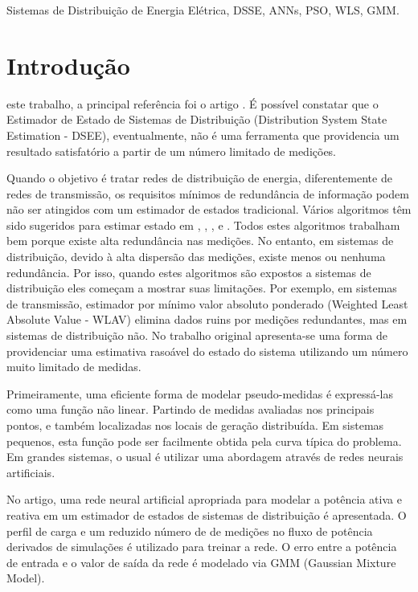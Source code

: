 \documentclass{IEEEtran}
\begin{document}
\begin{IEEEkeywords}
Sistemas de Distribuição de Energia Elétrica, DSSE, ANNs, PSO, WLS, GMM.
\end{IEEEkeywords}

\IEEEpeerreviewmaketitle

\section{Introdução}
 este trabalho, a principal referência foi o artigo \cite{manitsas2012distribution}. É possível constatar que o Estimador de Estado de Sistemas de Distribuição (Distribution System State Estimation - DSEE), eventualmente, não é uma ferramenta que providencia um resultado satisfatório a partir de um número limitado de medições. 

Quando o objetivo é tratar redes de distribuição de energia, diferentemente de redes de transmissão, os requisitos mínimos de redundância de informação podem não ser atingidos com um estimador de estados tradicional. Vários algoritmos têm sido sugeridos para estimar estado em \cite{schweppe1970powerI}, \cite{schweppe1970powerII}, \cite{schweppe1970powerIII}, \cite{abur2004power} e \cite{monticelli2000electric}. Todos estes algoritmos trabalham bem porque existe alta redundância nas medições. No entanto, em sistemas de distribuição, devido à alta dispersão das medições, existe menos ou nenhuma redundância. Por isso, quando estes algoritmos são expostos a sistemas de distribuição eles começam a mostrar suas limitações. Por exemplo, em sistemas de transmissão, estimador por mínimo valor absoluto ponderado (Weighted Least Absolute Value - WLAV) elimina dados ruins por medições redundantes, mas em sistemas de distribuição não. No trabalho original apresenta-se uma forma de providenciar uma estimativa rasoável do estado do sistema utilizando um número muito limitado de medidas.

Primeiramente, uma eficiente forma de modelar pseudo-medidas é expressá-las como uma função não linear. Partindo de medidas avaliadas nos principais pontos, e também localizadas nos locais de geração distribuída. Em sistemas pequenos, esta função pode  ser facilmente obtida pela curva típica do problema. Em grandes sistemas, o usual é utilizar uma abordagem através de redes neurais artificiais.

No artigo, uma rede neural artificial apropriada para modelar a potência ativa e reativa em um estimador de estados de sistemas de distribuição é apresentada. O perfil de carga e um reduzido número de de medições no fluxo de potência derivados de simulações é utilizado para treinar a rede. O erro entre a potência de entrada e o valor de saída da rede é modelado via GMM (Gaussian Mixture Model).
\end{document}
